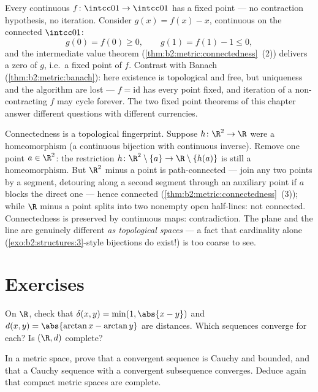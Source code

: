 \begin{example}\label{ex:b2:metric:ivtfixed}
Every continuous $f \colon \intcc01 \to \intcc01$ has a fixed
point --- no contraction hypothesis, no iteration. Consider
$g(x) = f(x) - x$, continuous on the connected $\intcc01$:
\[
g(0) = f(0) \geq 0,
\qquad
g(1) = f(1) - 1 \leq 0 ,
\]
and the intermediate value theorem
(\cref{thm:b2:metric:connectedness}~(2)) delivers a zero of
$g$, i.e.\ a fixed point of $f$. Contrast with Banach
(\cref{thm:b2:metric:banach}): here existence is topological
and free, but uniqueness and the algorithm are lost --- $f =
\mathrm{id}$ has every point fixed, and iteration of a
non-contracting $f$ may cycle forever. The two fixed point
theorems of this chapter answer different questions with
different currencies.
\end{example}

\begin{example}\label{ex:b2:metric:rnotr2}
Connectedness is a topological fingerprint. Suppose $h \colon
\R^2 \to \R$ were a homeomorphism (a continuous bijection with
continuous inverse). Remove one point $a \in \R^2$: the
restriction $h \colon \R^2\setminus\{a\} \to
\R\setminus\{h(a)\}$ is still a homeomorphism. But $\R^2$ minus
a point is path-connected --- join any two points by a segment,
detouring along a second segment through an auxiliary point if
$a$ blocks the direct one --- hence connected
(\cref{thm:b2:metric:connectedness}~(3)); while $\R$ minus a
point splits into two nonempty open half-lines: not connected.
Connectedness is preserved by continuous maps: contradiction.
The plane and the line are genuinely different \emph{as
topological spaces} --- a fact that cardinality alone
(\cref{exo:b2:structures:3}-style bijections do exist!) is too
coarse to see.
\end{example}

\section{Exercises}

\begin{exercise}[$\star$]\label{exo:b2:metric:1}
On $\R$, check that $\delta(x, y) = \min(1, \abs{x - y})$ and
$d(x,y) = \abs{\arctan x - \arctan y}$ are distances. Which
sequences converge for each? Is $(\R, d)$ complete?
\end{exercise}

\begin{exercise}[$\star$]\label{exo:b2:metric:2}
In a metric space, prove that a convergent sequence is Cauchy and
bounded, and that a Cauchy sequence with a convergent subsequence
converges. Deduce again that compact metric spaces are complete.
\end{exercise}


